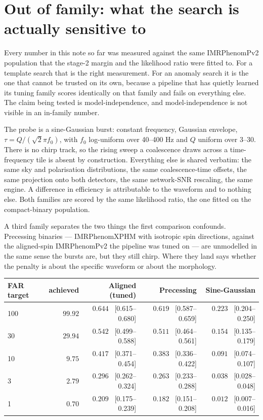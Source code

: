 \documentclass[11pt]{article}
\begin{document}
\section{Out of family: what the search is actually sensitive to}
\label{sec:outoffamily}

Every number in this note so far was measured against the same IMRPhenomPv2 population
that the stage-2 margin and the likelihood ratio were fitted to. For a template search
that is the right measurement. For an anomaly search it is the one that cannot be
trusted on its own, because a pipeline that has quietly learned its tuning family scores
identically on that family and fails on everything else. The claim being tested is
model-independence, and model-independence is not visible in an in-family number.

The probe is a sine-Gaussian burst: constant frequency, Gaussian envelope,
$\tau = Q/(\sqrt{2}\pi f_0)$, with $f_0$ log-uniform over 40--400 Hz and $Q$ uniform over
3--30. There is no chirp track, so the rising sweep a coalescence draws across a
time-frequency tile is absent by construction. Everything else is shared verbatim: the
same sky and polarisation distributions, the same coalescence-time offsets, the same
projection onto both detectors, the same network-SNR rescaling, the same engine. A
difference in efficiency is attributable to the waveform and to nothing else. Both
families are scored by the same likelihood ratio, the one fitted on the compact-binary
population.

A third family separates the two things the first comparison confounds. Precessing
binaries --- IMRPhenomXPHM with isotropic spin directions, against the aligned-spin
IMRPhenomPv2 the pipeline was tuned on --- are unmodelled in the same sense the bursts
are, but they still chirp. Where they land says whether the penalty is about the specific
waveform or about the morphology.

\begin{center}
\begin{tabular}{lrrrr}
\toprule
FAR target & achieved & Aligned (tuned) & Precessing & Sine-Gaussian \\
\midrule
100 & $99.92$ & $0.644$ \ [0.615--0.680] & $0.619$ \ [0.587--0.659] & $0.223$ \ [0.204--0.250] \\
30  & $29.94$ & $0.542$ \ [0.499--0.588] & $0.511$ \ [0.464--0.561] & $0.154$ \ [0.135--0.179] \\
10  & $9.75$  & $0.417$ \ [0.371--0.454] & $0.383$ \ [0.336--0.422] & $0.091$ \ [0.074--0.107] \\
3   & $2.79$  & $0.296$ \ [0.262--0.324] & $0.263$ \ [0.233--0.288] & $0.038$ \ [0.028--0.048] \\
1   & $0.70$  & $0.209$ \ [0.175--0.239] & $0.182$ \ [0.151--0.208] & $0.012$ \ [0.007--0.016] \\
\bottomrule
\end{tabular}
\end{center}
\end{document}
